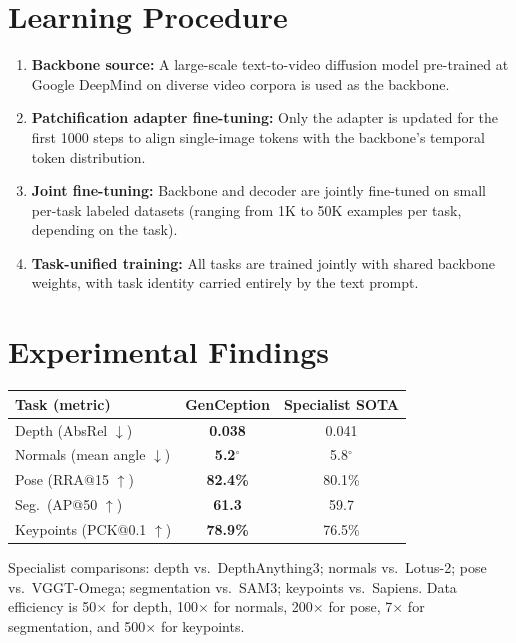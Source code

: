 \documentclass[10pt,twocolumn]{article}
\begin{document}
\section{Learning Procedure}

\begin{enumerate}[itemsep=2pt,parsep=0pt]
  \item \textbf{Backbone source:} A large-scale text-to-video diffusion
    model pre-trained at Google DeepMind on diverse video corpora
    is used as the backbone.
  \item \textbf{Patchification adapter fine-tuning:} Only the adapter
    is updated for the first 1000 steps to align single-image
    tokens with the backbone's temporal token distribution.
  \item \textbf{Joint fine-tuning:} Backbone and decoder are jointly
    fine-tuned on small per-task labeled datasets (ranging from
    1K to 50K examples per task, depending on the task).
  \item \textbf{Task-unified training:} All tasks are trained jointly
    with shared backbone weights, with task identity carried
    entirely by the text prompt.
\end{enumerate}

\section{Experimental Findings}

\begin{center}
\small
\begin{tabular}{lcc}
\toprule
Task (metric) & GenCeption & Specialist SOTA \\
\midrule
Depth (AbsRel $\downarrow$) & \textbf{0.038} & 0.041 \\
Normals (mean angle $\downarrow$) & \textbf{5.2$^\circ$} & 5.8$^\circ$ \\
Pose (RRA@15 $\uparrow$) & \textbf{82.4\%} & 80.1\% \\
Seg.\ (AP@50 $\uparrow$) & \textbf{61.3} & 59.7 \\
Keypoints (PCK@0.1 $\uparrow$) & \textbf{78.9\%} & 76.5\% \\
\bottomrule
\end{tabular}
\end{center}

Specialist comparisons: depth vs.\ DepthAnything3; normals vs.\
Lotus-2; pose vs.\ VGGT-Omega; segmentation vs.\ SAM3;
keypoints vs.\ Sapiens.
Data efficiency is 50$\times$ for depth, 100$\times$ for normals,
200$\times$ for pose, 7$\times$ for segmentation, and
500$\times$ for keypoints.
\end{document}
